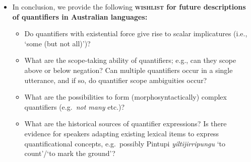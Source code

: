 \documentclass{article}
\begin{document}
\begin{itemize}
\item In conclusion, we provide the following \textbf{\textsc{wishlist} for future descriptions of quantifiers in Australian languages:}
  \begin{itemize}
  \item Do quantifiers with existential force give rise to scalar implicatures (i.e., `some (but not all)')?
  \item What are the scope-taking ability of quantifiers; e.g., can they scope above or below negation? Can multiple quantifiers occur in a single utterance, and if so, do quantifier scope ambiguities occur?
  \item What are the possibilities to form (morphosyntactically) complex quantifiers (e.g.\ \textit{not many} etc.)?
  \item What are the historical sources of quantifier expressions? Is there evidence for speakers adapting existing lexical items to express quantificational concepts, e.g.\ possibly Pintupi \textit{yiltijirripungu} `to count'/`to mark the ground'?
  \end{itemize}
\end{itemize}

{\small
  
  
}
\end{document}
